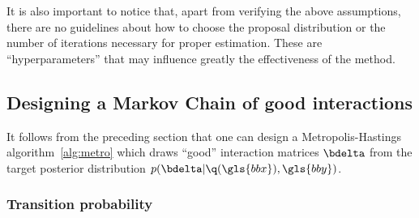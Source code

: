 It is also important to notice that, apart from verifying the above assumptions, there are no guidelines about how to choose the proposal distribution or the number of iterations necessary for proper estimation. These are ``hyperparameters'' that may influence greatly the effectiveness of the method.

\subsection{Designing a Markov Chain of good interactions} \label{subsec:mcmc}

It follows from the preceding section that one can design a Metropolis-Hastings algorithm~\eqref{alg:metro} which draws ``good'' interaction matrices $\bdelta$ from the target posterior distribution $p(\bdelta | \q(\gls{bbx}),\gls{bby})$.

\subsubsection{Transition probability}

